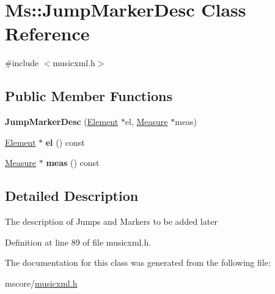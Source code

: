\hypertarget{class_ms_1_1_jump_marker_desc}{}\section{Ms\+:\+:Jump\+Marker\+Desc Class Reference}
\label{class_ms_1_1_jump_marker_desc}


{\ttfamily \#include $<$musicxml.\+h$>$}

\subsection*{Public Member Functions}
\begin{DoxyCompactItemize}
\item 
\mbox{\label{class_ms_1_1_jump_marker_desc_a87b5cdaa8d284317d5aafae093f63a78}} 
{\bfseries Jump\+Marker\+Desc} (\hyperlink{class_ms_1_1_element}{Element} $\ast$el, \hyperlink{class_ms_1_1_measure}{Measure} $\ast$meas)
\item 
\mbox{\label{class_ms_1_1_jump_marker_desc_a5d31315a07ab33534a0af7aab5540207}} 
\hyperlink{class_ms_1_1_element}{Element} $\ast$ {\bfseries el} () const
\item 
\mbox{\label{class_ms_1_1_jump_marker_desc_aa5663f19780c45c85a463f4d026c3965}} 
\hyperlink{class_ms_1_1_measure}{Measure} $\ast$ {\bfseries meas} () const
\end{DoxyCompactItemize}


\subsection{Detailed Description}
The description of Jumps and Markers to be added later 

Definition at line 89 of file musicxml.\+h.



The documentation for this class was generated from the following file\+:\begin{DoxyCompactItemize}
\item 
mscore/\hyperlink{musicxml_8h}{musicxml.\+h}\end{DoxyCompactItemize}
